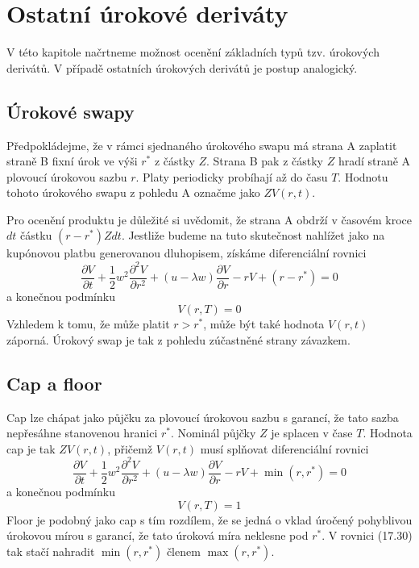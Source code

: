 \documentclass[a4paper]{book}
\begin{document}
\section{Ostatní úrokové deriváty}

V této kapitole načrtneme možnost ocenění základních typů tzv. úrokových derivátů. V případě ostatních úrokových derivátů je postup analogický.

\subsection{Úrokové swapy}

Předpokládejme, že v rámci sjednaného úrokového swapu má strana A zaplatit straně B fixní úrok ve výši $r^{*}$ z částky $Z$. Strana B pak z částky $Z$ hradí straně A plovoucí úrokovou sazbu $r$. Platy periodicky probíhají až do času $T$. Hodnotu tohoto úrokového swapu z pohledu A označme jako $ZV(r,t)$.

Pro ocenění produktu je důležité si uvědomit, že strana A obdrží v časovém kroce $dt$ částku $(r - r^{*})Z dt$. Jestliže budeme na tuto skutečnost nahlížet jako na kupónovou platbu generovanou dluhopisem, získáme diferenciální rovnici
\begin{equation*}
\frac{\partial V}{\partial t} + \frac{1}{2}w^2 \frac{\partial^2 V}{\partial r^2} + (u - \lambda w) \frac{\partial V}{\partial r} - rV + (r - r^{*}) = 0
\end{equation*}
a konečnou podmínku
\begin{equation*}
V(r,T) = 0
\end{equation*}
Vzhledem k tomu, že může platit $r > r^{*}$, může být také hodnota $V(r,t)$ záporná. Úrokový swap je tak z pohledu zúčastněné strany závazkem.

\subsection{Cap a floor}

Cap lze chápat jako půjčku za plovoucí úrokovou sazbu s garancí, že tato sazba nepřesáhne stanovenou hranici $r^{*}$. Nominál půjčky $Z$ je splacen v čase $T$. Hodnota cap je tak $ZV(r,t)$, přičemž $V(r,t)$ musí splňovat diferenciální rovnici
\begin{equation}
\frac{\partial V}{\partial t} + \frac{1}{2}w^2\frac{\partial^2 V}{\partial r^2} + (u - \lambda w) \frac{\partial V}{\partial r} - rV + \min(r, r^{*}) = 0
\end{equation}
a konečnou podmínku
\begin{equation*}
V(r,T) = 1
\end{equation*}
Floor je podobný jako cap s tím rozdílem, že se jedná o vklad úročený pohyblivou úrokovou mírou s garancí, že tato úroková míra neklesne pod $r^{*}$. V rovnici (17.30) tak stačí nahradit $\min(r, r^{*})$ členem $\max(r, r^{*})$.
\end{document}
